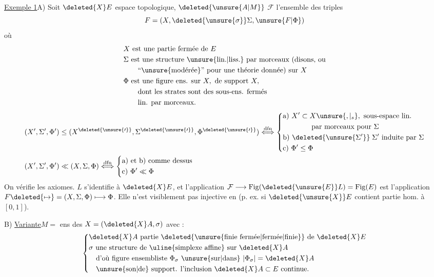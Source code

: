 \uline{Exemple 1}\quad {}A) Soit $\deleted{X}E$ espace topologique, $\deleted{\unsure{A|M}}$
$\mathcal F$ l'ensemble des   triples
\[
F=(X,\deleted{\unsure{\sigma}}\Sigma,\unsure{F|\Phi})
\]
où
\[
\begin{aligned}
&X\ \text{est une partie fermée de } E\\
&\Sigma\ \text{est une structure \unsure{lin.|liss.} par morceaux (disons, ou}\\
&\qquad\text{``\unsure{modérée}'' pour une théorie donnée) sur } X\\
&\Phi\ \text{est une figure ens. sur } X,\ \text{de support }X,\\
&\qquad\text{dont les strates sont des sous-ens. fermés}\\
&\qquad\text{lin. par morceaux.}
\end{aligned}
\]
\[
\begin{aligned}
(X',\Sigma',\Phi') &\leq (X^{\deleted{\unsure{\prime}}},\Sigma^{\deleted{\unsure{\prime}}},\Phi^{\deleted{\unsure{\prime}}})
\overset{\mathrm{dfn}}{\Longleftrightarrow}
\left\{\begin{aligned}
&\text{a) }X'\subset X\unsure{,|{}_{s}},\ \text{sous-espace lin.}\\
&\hspace{4em}\text{par morceaux pour }\Sigma\\
&\text{b) }\deleted{\unsure{\Sigma'} }\;\Sigma'\ \text{induite par }\Sigma\\
&\text{c) }\Phi'\leq\Phi
\end{aligned}\right.\\
(X',\Sigma',\Phi') &\ll (X,\Sigma,\Phi)
\overset{\mathrm{dfn}}{\Longleftrightarrow}
\left\{\begin{aligned}
&\text{a) et b) comme dessus}\\
&\text{c) }\Phi'\ll\Phi
\end{aligned}\right.
\end{aligned}
\]
On vérifie les axiomes.  $L$ s'identifie à $\deleted{X}E$, et l'application  $\mathcal F\longrightarrow\mathrm{Fig}(\deleted{\unsure{E}}L)=\mathrm{Fig}(E)$ est l'application $F\deleted{\mapsto}=(X,\Sigma,\Phi)\longmapsto\Phi$. Elle n'est visiblement pas injective en  (p. ex. si $\deleted{\unsure{X}}E$ contient partie hom. à $[0,1]$).

B) \uline{Variante}\quad $M={}$ ens des   $X=(\deleted{X}A,\sigma)$ avec :
\[
\left\{\begin{aligned}
&\deleted{X}A\ \text{partie \deleted{\unsure{finie fermée|fermée|finie}} de }\deleted{X}E\\
&\sigma\ \text{une structure de \uline{simplexe affine} sur }\deleted{X}A\\
&\quad\text{d'où figure ensembliste }\Phi_\sigma\ \text{\unsure{sur|dans} }|\Phi_\sigma|=\deleted{X}A\\
&\quad\text{\unsure{son|de} support. l'inclusion }\deleted{X}A\subset E\ \text{continue.}
\end{aligned}\right.
\]

